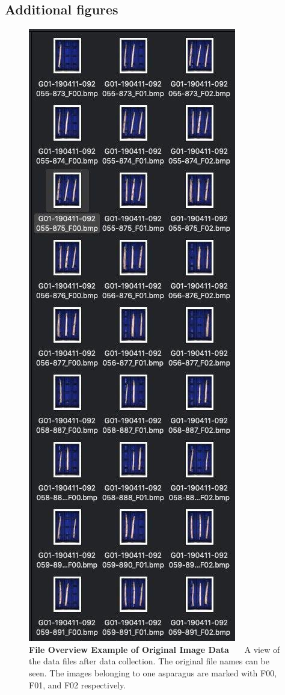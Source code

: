 \newpage

\subsection{Additional figures}
\label{sec:AddFigures}

\begin{figure}[h]
	\centering
	\includegraphics[scale=0.4]{Figures/appendix/original_files_naming_conventions.png}
	\decoRule
	\caption[File Overview Example of Original Image Data]{\textbf{File Overview Example of Original Image Data}~~~ A view of the data files after data collection. The original file names can be seen. The images belonging to one asparagus are marked with F00, F01, and F02 respectively.}
	\label{fig:Original_Data_Overview}
\end{figure}

